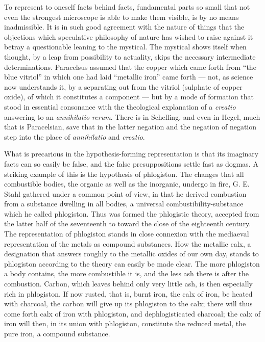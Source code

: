 \documentclass[12pt,a4paper]{book}
\begin{document}
To represent to oneself facts behind facts, fundamental parts so small that not even the strongest microscope is able to
make them visible, is by no means inadmissible. It is in such good agreement with the nature of things that the
objections which speculative philosophy of nature has wished to raise against it betray a questionable leaning to the
mystical. The mystical shows itself when thought, by a leap from possibility to actuality, skips the necessary
intermediate determinations. Paracelsus assumed that the copper which came forth from ``the blue vitriol'' in which one
had laid ``metallic iron'' came forth --- not, as science now understands it, by a separating out from the vitriol
(sulphate of copper oxide), of which it constitutes a component --- but by a mode of formation that stood in essential
consonance with the theological explanation of a \textit{creatio} answering to an \textit{annihilatio rerum}. There is in
Schelling, and even in Hegel, much that is Paracelsian, save that in the latter negation and the negation of negation
step into the place of \textit{annihilatio} and \textit{creatio}.

What is precarious in the hypothesis-forming representation is that its imaginary facts can so easily be false, and the
false presuppositions settle fast as dogmas. A striking example of this is the hypothesis of phlogiston. The changes that
all combustible bodies, the organic as well as the inorganic, undergo in fire, G. E. Stahl gathered under a common point
of view, in that he derived combustion from a substance dwelling in all bodies, a universal combustibility-substance
which he called phlogiston. Thus was formed the phlogistic theory,
accepted from the latter half of the seventeenth to toward the close of the eighteenth century. The representation of
phlogiston stands in close connexion with the mediaeval representation of the metals as compound substances. How the
metallic calx, a designation that answers roughly to the metallic oxides of our own day, stands to phlogiston according
to the theory can easily be made clear. The more phlogiston a body contains, the more combustible it is, and the less ash
there is after the combustion. Carbon, which leaves behind only very little ash, is then especially rich in phlogiston.
If now rusted, that is, burnt iron, the calx of iron, be heated with charcoal, the carbon will give up its phlogiston to
the calx; there will thus come forth calx of iron with phlogiston, and dephlogisticated charcoal; the calx of iron will
then, in its union with phlogiston, constitute the reduced metal, the pure iron, a compound substance.
\end{document}
